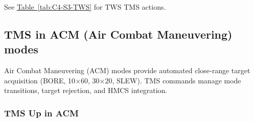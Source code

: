 \documentclass[11pt, a4paper, twoside]{report}
\newcommand{\tabref}[1]{\hyperref[#1]{Table~\ref*{#1}}}
\begin{document}
See \tabref{tab:C4-S3-TWS} for TWS TMS actions.

\subsection{TMS in ACM (Air Combat Maneuvering) modes}
\label{sec:C4-S3-S4}

Air Combat Maneuvering (ACM) modes provide automated close-range target 
acquisition (BORE, 10$\times$60, 30$\times$20, SLEW). TMS commands manage 
mode transitions, target rejection, and HMCS integration.

\subsubsection*{TMS Up in ACM}
\label{sec:C4-S3-S4-S1}
\end{document}
